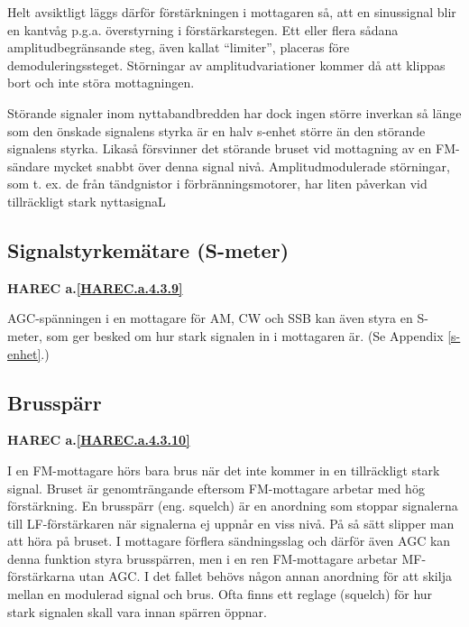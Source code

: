 Helt avsiktligt läggs därför förstärkningen i mottagaren så, att en
sinussignal blir en kantvåg p.g.a. överstyrning i
förstärkarstegen. Ett eller flera sådana amplitudbegränsande steg,
även kallat ``limiter'', placeras före demoduleringssteget. Störningar
av amplitudvariationer kommer då att klippas bort och inte störa
mottagningen.

Störande signaler inom nyttabandbredden har dock ingen större inverkan
så länge som den önskade signalens styrka är en halv s-enhet större än
den störande signalens styrka. Likaså försvinner det störande bruset
vid mottagning av en FM-sändare mycket snabbt över denna signal
nivå. Amplitudmodulerade störningar, som t. ex. de från tändgnistor i
förbränningsmotorer, har liten påverkan vid tillräckligt stark
nyttasignaL

\subsection{Signalstyrkemätare (S-meter)}
\textbf{HAREC a.\ref{HAREC.a.4.3.9}\label{myHAREC.a.4.3.9}}

AGC-spänningen i en mottagare för AM, CW och SSB kan även styra en
S-meter, som ger besked om hur stark signalen in i mottagaren är. (Se
Appendix \ref{s-enhet}.)

\subsection{Brusspärr}
\textbf{HAREC a.\ref{HAREC.a.4.3.10}\label{myHAREC.a.4.3.10}}

I en FM-mottagare hörs bara brus när det inte kommer in en
tillräckligt stark signal.  Bruset är genomträngande eftersom
FM-mottagare arbetar med hög förstärkning. En brusspärr (eng. squelch)
är en anordning som stoppar signalerna till LF-förstärkaren när
signalerna ej uppnår en viss nivå. På så sätt slipper man att höra på
bruset. I mottagare förflera sändningsslag och därför även AGC kan
denna funktion styra brusspärren, men i en ren FM-mottagare arbetar
MF-förstärkarna utan AGC. I det fallet behövs någon annan anordning för
att skilja mellan en modulerad signal och brus. Ofta finns ett reglage
(squelch) för hur stark signalen skall vara innan spärren öppnar.
